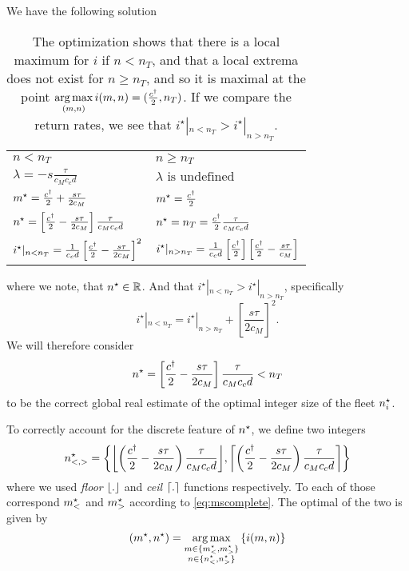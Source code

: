 \documentclass[a4paper]{report}
\DeclarePairedDelimiter\floor{\lfloor}{\rfloor}
\DeclarePairedDelimiter\ceil{\lceil}{\rceil}
\DeclareMathOperator*{\argmax}{arg\,max}
\begin{document}
We have the following solution

\def\ils{i^\star|_{n<n_T}}
\def\igs{i^\star|_{n>n_T}}
\begin{table}[h!]
	\centering
	\begin{tabular}{p{}| p{}}
		$n < n_T$								& $n \geq n_T$ \\
		$\lambda= -s\frac{\tau}{c_Mc_cd}$			& $\lambda \text{ is undefined}$ \\
		$m^{\star}=\frac{c^{\dagger}}{2}+\frac{s\tau}{2c_M}$		& $m^{\star}= \frac{c^{\dagger}}{2}$ \\
		$n^\star=\left[\frac{c^{\dagger}}{2}-\frac{s\tau}{2c_M}\right]\frac{\tau}{c_Mc_cd}$ & $n^\star=n_T=\frac{c^{\dagger}}{2}\frac{\tau}{c_Mc_cd}$ \\
		$ \ils=\frac{1}{c_cd} \left[\frac{\cd}{2}-\frac{s\tau}{2c_M}\right]^2$	&
		$ \igs=\frac{1}{c_cd}\left[\frac{\cd}{2}\right]\left[\frac{\cd}{2}-\frac{s\tau}{c_M}\right] $
	\end{tabular}
	\caption{The optimization shows that there is a local maximum for $i$ if $n<n_T$, and that a local extrema does not exist for $n\geq n_T$, and so it is maximal at the point $\argmax\limits_{(m,n)} i(m,n)= (\frac{\cd}{2},n_T)$. If we compare the return rates, we see that $\ils>\igs$.}
	\label{tab:twolagrangesolution}
\end{table}

where we note, that $n^\star\in\mathbb{R}$. And that $\ils>\igs$, specifically $$\ils = \igs + \left[\frac{s\tau}{2c_M}\right]^2.$$  We will therefore consider $$n^\star=\left[\frac{c^{\dagger}}{2}-\frac{s\tau}{2c_M}\right]\frac{\tau}{c_Mc_cd}<n_T$$ to be the correct global real estimate of the optimal integer size of the fleet $n^\star_i$.

To correctly account for the discrete feature of $n^\star$, we define two integers
\def\nsd{\left(\frac{\cd}{2}-\frac{s\tau}{2c_M}\right)\frac{\tau}{c_Mc_cd}}
\begin{equation}
	n^\star_{<,>} = \left\{\floor*{\nsd}, \ceil*{\nsd}\right\}\label{eq:twons}
\end{equation}
where we used \emph{floor} $\floor*{.}$ and \emph{ceil} $\ceil*{.}$ functions respectively. To each of those correspond $m^{\star}_<$ and $m^{\star}_>$ according to \autoref{eq:mscomplete}. The optimal of the two is given by
\begin{equation}
	(\ms,\ns)=\argmax\limits_{\substack{m\in\{\ms_<,\ms_>\} \\ n\in\{\ns_<,\ns_>\}}}\left\{i(m,n)\right\} \label{eq:argmaxlagrange}
\end{equation}
\end{document}
